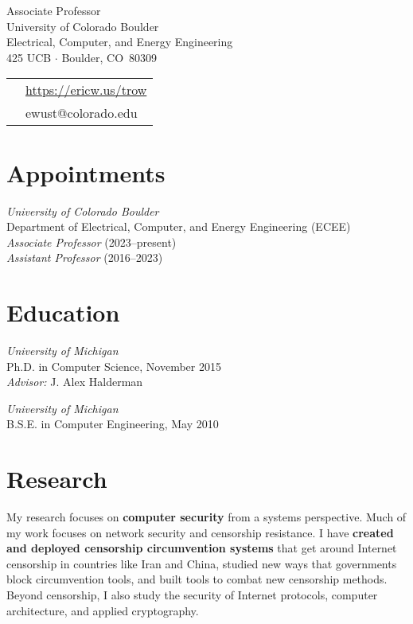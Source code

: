 \documentclass[margin,11pt]{res} %
\begin{document}
\begin{adjustwidth}{-1.3in}{0pt}
\vspace{20pt}

\noindent 
\parbox[m]{4in}{
Associate Professor \\
University of Colorado Boulder\\
Electrical, Computer, and Energy Engineering\\
425 UCB $\cdot$ Boulder, CO \,80309
}
\begin{tabular}{ll}
{}&\url{https://ericw.us/trow}\\
{}&ewust@colorado.edu\\
\end{tabular}
\vspace{10pt}
\end{adjustwidth}

\section{\large Appointments}

        \emph{University of Colorado Boulder} \\
        Department of Electrical, Computer, and Energy Engineering (ECEE) \\
        \emph{Associate Professor} (2023--present) \\
        \emph{Assistant Professor} (2016--2023)

\section{\large Education}

        \emph{University of Michigan}\\
        Ph.D. in Computer Science, November 2015\\
        \emph{Advisor:} J. Alex Halderman

        \emph{University of Michigan}\\
        B.S.E. in Computer Engineering, May 2010

\vspace{6pt}
\section{\large Research}

My research focuses on \textbf{computer security} from a systems perspective.
Much of my work focuses on network security and censorship resistance.
I have \textbf{created and deployed censorship circumvention systems} that get around Internet
censorship in countries like Iran and China, studied new ways that governments
block circumvention tools, and built tools to combat new censorship methods.
Beyond censorship, I also study the security of Internet protocols, computer architecture, and applied cryptography. %
\end{document}
